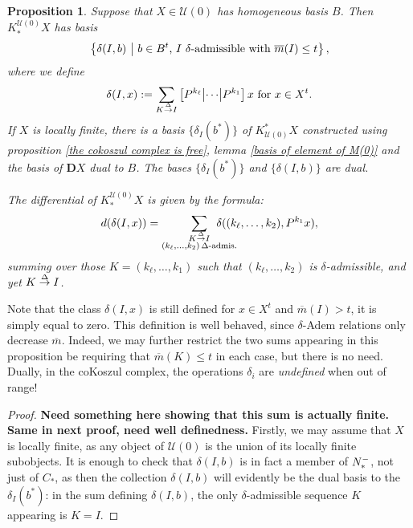 \documentclass[11pt]{amsart}
\theoremstyle{plain}
\newtheorem{prop}[thm]{Proposition}
\theoremstyle{definition}
\newcommand{\calU}{\mathcal{U}}
\theoremstyle{plain}
\newcommand{\deltaalg}{\Delta} %
\newcommand{\minDimP}{\overline{m}}
\newcommand{\produces}[3]{#3:#1\sim #2}
\renewcommand{\produces}[3]{#1\rightarrow_{#3} #2}%
\renewcommand{\produces}[3]{#1\overset{\smash{#3}}{\rightarrow} #2}%
\newcommand{\Nop}{N^{\smash{-}}}
\newcommand{\dual}{\mathbf{D}}
\begin{document}
\begin{Koszul complexes}
\begin{prop}\label{propDerivedIndTrivialUobject n=0}
Suppose that $X\in\calU(0)$ has homogeneous basis $B$. Then $K_*^{\calU(0)}X$ has basis
\[\left\{\delta(I,b)\ \middle|\ b\in B^t\textup{, $I$ $\delta$-admissible with }\minDimP(I)\leq t\right\},\]
where we define
\[\delta(I,x):=
\sum_{\produces{K}{I}{\deltaalg}}\left[P^{k_\ell} \middle|\cdots\middle|P^{k_1} \right]x\textup{ for $x\in X^t$}.\]
%
If $X$ is locally finite, there is a basis $\{\delta_I(b^*)\}$ of $K^*_{\calU(0)}X$ constructed using proposition \ref{the cokoszul complex is free}, lemma \ref{basis of element of M(0)} and the basis of $\dual X$ dual to $B$. The bases $\{\delta_I(b^*)\}$ and $\{\delta(I,b)\}$ are dual.

The differential of $K^{\calU(0)}_*X$ is given by the formula:
\[d(\delta(I,x))=\sum_{ \substack{\produces{K}{I}{\deltaalg}\\(k_{\ell},\ldots,k_2){\,\deltaalg\textup{-admis.}}}}\!\!\!\!\!\!\!\!\!\!\!\! \delta((k_{\ell},\ldots,k_2),P^{k_1}x),\]
summing over those $K=(k_{\ell},\ldots,k_1)$ such that $(k_{\ell},\ldots,k_2)$ is $\delta$-admissible, and yet $\produces{K}{I}{\deltaalg}$.
\end{prop}
Note that the class $\delta(I,x)$ is still defined for $x\in X^t$ and $\minDimP(I)>t$, it is simply equal to zero. This definition is well behaved, since $\delta$-Adem relations only decrease $\minDimP$. Indeed, we may further restrict the two sums appearing in this proposition be requiring that $\minDimP(K)\leq t$ in each case, but there is no need. Dually, in the coKoszul complex, the operations $\delta_i$ are \emph{undefined} when out of range!
\begin{proof}\textbf{Need something here showing that this sum is actually finite. Same in next proof, need well definedness.}
Firstly, we may assume that $X$ is locally finite, as any object of $\calU(0)$ is the union of its locally finite subobjects. It is enough to check that $\delta(I,b)$ is in fact a member of $\Nop_*$, not just of $C_*$, as then the collection $\delta(I,b)$ will evidently be the dual basis to the $\delta_I(b^*)$: in the sum defining $\delta(I,b)$, the only $\delta$-admissible sequence $K$ appearing is $K=I$.  %


\end{proof}
\end{Koszul complexes}
\end{document}
